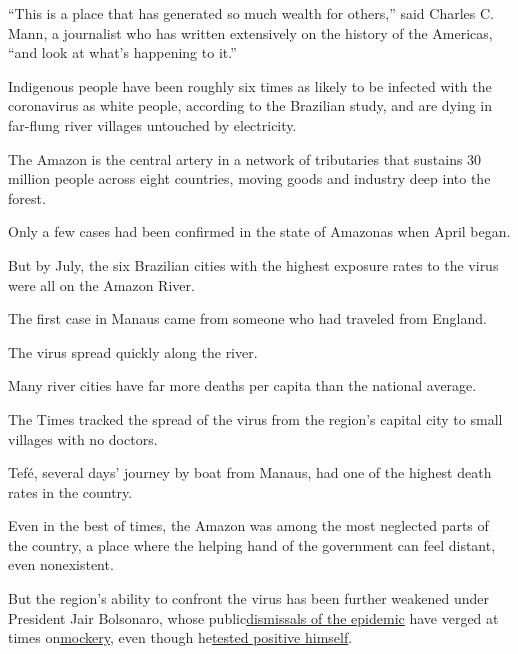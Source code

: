 ``This is a place that has generated so much wealth for others,'' said
Charles C. Mann, a journalist who has written extensively on the history
of the Americas, ``and look at what's happening to it.''

Indigenous people have been roughly six times as likely to be infected
with the coronavirus as white people, according to the Brazilian study,
and are dying in far-flung river villages untouched by electricity.

The Amazon is the central artery in a network of tributaries that
sustains 30 million people across eight countries, moving goods and
industry deep into the forest.

Only a few cases had been confirmed in the state of Amazonas when April
began.

But by July, the six Brazilian cities with the highest exposure rates to
the virus were all on the Amazon River.

The first case in Manaus came from someone who had traveled from
England.

The virus spread quickly along the river.

Many river cities have far more deaths per capita than the national
average.

The Times tracked the spread of the virus from the region's capital city
to small villages with no doctors.

Tefé, several days' journey by boat from Manaus, had one of the highest
death rates in the country.

Even in the best of times, the Amazon was among the most neglected parts
of the country, a place where the helping hand of the government can
feel distant, even nonexistent.

But the region's ability to confront the virus has been further weakened
under President Jair Bolsonaro, whose
public\href{https://www.nytimes3xbfgragh.onion/2020/06/08/world/americas/brazil-coronavirus-statistics.html}{}\href{https://www.nytimes3xbfgragh.onion/2020/06/08/world/americas/brazil-coronavirus-statistics.html}{dismissals
of the epidemic} have verged at times
on\href{https://www.nytimes3xbfgragh.onion/2020/05/01/world/americas/brazil-bolsonaro-coronavirus-crisis.html}{}\href{https://www.nytimes3xbfgragh.onion/2020/05/01/world/americas/brazil-bolsonaro-coronavirus-crisis.html}{mockery},
even though
he\href{https://www.nytimes3xbfgragh.onion/2020/07/07/world/americas/brazil-bolsonaro-coronavirus.html}{}\href{https://www.nytimes3xbfgragh.onion/2020/07/07/world/americas/brazil-bolsonaro-coronavirus.html}{tested
positive himself}.

